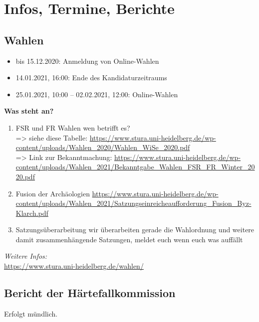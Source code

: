 \section{Infos, Termine, Berichte}
\subsection{Wahlen}
\begin{itemize}
    \item bis 15.12.2020: Anmeldung von Online-Wahlen
    \item 14.01.2021, 16:00: Ende des Kandidaturzeitraums
    \item 25.01.2021, 10:00 – 02.02.2021, 12:00: Online-Wahlen
\end{itemize}
\textbf{Was steht an?}
\begin{enumerate}
    \item FSR und FR Wahlen wen betrifft es?\\
    => siehe diese Tabelle: \url{https://www.stura.uni-heidelberg.de/wp-content/uploads/Wahlen_2020/Wahlen_WiSe_2020.pdf}\\
    => Link zur Bekanntmachung: \url{https://www.stura.uni-heidelberg.de/wp-content/uploads/Wahlen_2021/Bekanntgabe_Wahlen_FSR_FR_Winter_2020.pdf}
    \item Fusion der Archäologien \url{https://www.stura.uni-heidelberg.de/wp-content/uploads/Wahlen_2021/Satzungseinreicheaufforderung_Fusion_Byz-Klarch.pdf}
    \item  Satzungsüberarbeitung wir überarbeiten gerade die Wahlordnung und weitere damit zusammenhängende Satzungen, meldet euch wenn euch was auffällt
\end{enumerate}
\emph{Weitere Infos:}\\
\url{https://www.stura.uni-heidelberg.de/wahlen/}

\subsection{Bericht der Härtefallkommission}
Erfolgt mündlich.
